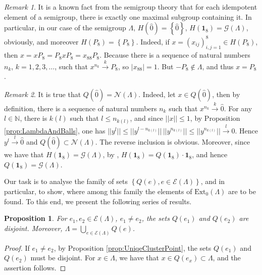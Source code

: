 \documentclass[12pt]{article}
\theoremstyle{plain}
\newtheorem{proposition}{Proposition}
\theoremstyle{definition}
\theoremstyle{remark}
\newtheorem{remark}{Remark}
\numberwithin{equation}{section}
\begin{document}
\begin{remark}
\label{rem:GOfLambda}
It is a known fact from the semigroup theory that for each idempotent
element of a semigroup, there is exactly one maximal subgroup containing it.
In particular, in our case of the semigroup $\Lambda$,
$H(\hat{0}) = \left \{ \hat{0} \right \}$,
$H(\mathbf{1}_{8}) = \mathcal{G}(\Lambda)$,
obviously,
and moreover $H(P_{8}) = \left \{ P_{8} \right \}$.
Indeed,
if $x = (x_{ij})_{i,j=1}^{8} \in H(P_{8})$,
then
$x = x P_{8} = P_{8} x P_{8} = x_{88} P_{8}$.
Because there is a sequence of natural numbers $n_{k}$, $k=1,2,3,\ldots$,
such that $x^{n_{k}} \overset{k}{\rightarrow} P_{8}$, so
$|x_{88}| = 1$. But $- P_{8} \notin \Lambda$, and thus $x = P_{8}$.
\end{remark}

\begin{remark}
    \label{rem:Qof1}
It is true that $Q(\hat{0}) = \mathcal{N}(\Lambda)$.
Indeed, let $x \in Q(\hat{0})$,
then by definition, there is a sequence of natural numbers $n_{k}$ such that
$x^{n_{k}} \overset{k}{\rightarrow} \hat{0}$.
For any $l \in \mathbb{N}$, there is $k(l)$ such that
$l \leq n_{k(l)}$, and since 
$||x|| \leq 1 $, by Proposition \ref{prop:LambdaAndBalls}, one has
$||y^{l}|| \leq ||y^{l - n_{k(l)}}|| \, ||y^{n_{k(l)}}|| \leq ||y^{n_{k(l)}}||
\overset{l}{\rightarrow} 0$.
Hence $y^{l} \overset{l}{\rightarrow} \hat{0}$
and $Q(\hat{0}) \subset \mathcal{N}(\Lambda)$.
The reverse inclusion is obvious.
Moreover, since we have that $H(\mathbf{1}_{8}) = \mathcal{G}(\Lambda)$,
    by \cite[Theorem 8]{schwarz1955hausdorff},
    $H(\mathbf{1}_{8}) = Q(\mathbf{1}_{8}) \cdot \mathbf{1}_{8}$,
    and hence $Q(\mathbf{1}_{8}) = \mathcal{G}(\Lambda)$.
\end{remark}

Our task is to analyse the family of sets
$\left \{ Q(e), e \in \mathcal{E}(\Lambda) \right \}$,
and in particular,
to show, where among this family the elements of
$\text{Ext}_{0}(\Lambda)$ are to be found.
To this end, we present the following series of results.    

\begin{proposition}
    For $e_{1}, e_{2} \in \mathcal{E}(\Lambda)$,
    $e_{1} \neq e_{2}$,
    the sets $Q(e_{1})$ and $Q(e_{2})$ are disjoint.
    Moreover,
    $\Lambda = \! \bigcup \limits_{e \in \mathcal{E}(\Lambda)} \! Q(e)$.
\end{proposition}
\begin{proof}
    If $e_{1} \neq e_{2}$, by Proposition \ref{prop:UniqeClusterPoint},
    the sets $Q(e_{1})$ and $Q(e_{2})$ must be disjoint.
    For $x \in \Lambda$, we have that $x \in Q(e_{x}) \subset \Lambda$,
    and the assertion follows.
\end{proof}
\end{document}
